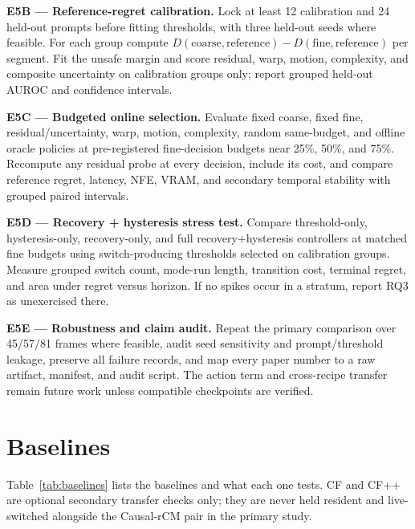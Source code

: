 \documentclass[11pt,a4paper]{article}
\begin{document}
\textbf{E5B --- Reference-regret calibration.} Lock at least 12 calibration and 24 held-out prompts before fitting thresholds, with three held-out seeds where feasible. For each group compute $D(\text{coarse},\text{reference})-D(\text{fine},\text{reference})$ per segment. Fit the unsafe margin and score residual, warp, motion, complexity, and composite uncertainty on calibration groups only; report grouped held-out AUROC and confidence intervals.

\textbf{E5C --- Budgeted online selection.} Evaluate fixed coarse, fixed fine, residual/uncertainty, warp, motion, complexity, random same-budget, and offline oracle policies at pre-registered fine-decision budgets near 25\%, 50\%, and 75\%. Recompute any residual probe at every decision, include its cost, and compare reference regret, latency, NFE, VRAM, and secondary temporal stability with grouped paired intervals.

\textbf{E5D --- Recovery + hysteresis stress test.} Compare threshold-only, hysteresis-only, recovery-only, and full recovery+hysteresis controllers at matched fine budgets using switch-producing thresholds selected on calibration groups. Measure grouped switch count, mode-run length, transition cost, terminal regret, and area under regret versus horizon. If no spikes occur in a stratum, report RQ3 as unexercised there.

\textbf{E5E --- Robustness and claim audit.} Repeat the primary comparison over 45/57/81 frames where feasible, audit seed sensitivity and prompt/threshold leakage, preserve all failure records, and map every paper number to a raw artifact, manifest, and audit script. The action term and cross-recipe transfer remain future work unless compatible checkpoints are verified.

\section{Baselines}\label{sec:baselines}

Table~\ref{tab:baselines} lists the baselines and what each one tests. CF and CF++ are optional secondary transfer checks only; they are never held resident and live-switched alongside the Causal-rCM pair in the primary study.
\end{document}

